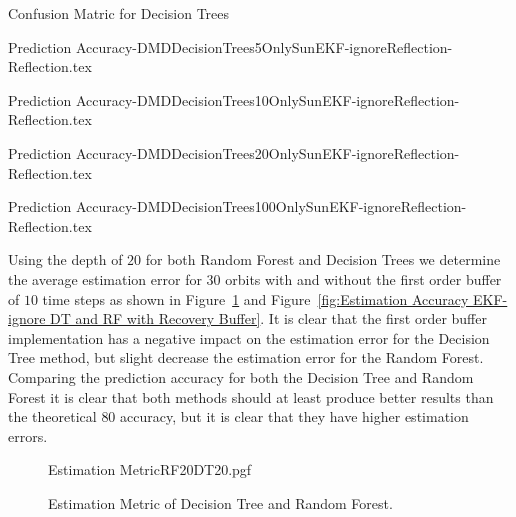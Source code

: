 \documentclass[letterpaper, 10 pt, conference]{ieeeconf}  %
\begin{document}
\begin{table*}[h!tb]
	\caption{Confusion Matric for Decision Trees} 
	\label{Table: Prediction Accuracy-DMDDecisionTreesOnlySunEKF-ignoreReflection-Reflection} 
	\centering
	\begin{minipage}[c]{0.2\textwidth}
		{Prediction Accuracy-DMDDecisionTrees5OnlySunEKF-ignoreReflection-Reflection.tex}
	\end{minipage}
	\begin{minipage}[c]{0.2\textwidth}
		{Prediction Accuracy-DMDDecisionTrees10OnlySunEKF-ignoreReflection-Reflection.tex}
	\end{minipage}
	\begin{minipage}[c]{0.2\textwidth}
		{Prediction Accuracy-DMDDecisionTrees20OnlySunEKF-ignoreReflection-Reflection.tex}
	\end{minipage}
	\begin{minipage}[c]{0.2\textwidth}
		{Prediction Accuracy-DMDDecisionTrees100OnlySunEKF-ignoreReflection-Reflection.tex}
	\end{minipage}
\end{table*}

Using the depth of $20$ for both Random Forest and Decision Trees we determine the average estimation error for $30$ orbits with and without the first order buffer of $10$ time steps as shown in Figure~\ref{fig:Estimation Accuracy EKF-ignore DT and RF} and Figure~\ref{fig:Estimation Accuracy EKF-ignore DT and RF with Recovery Buffer}. It is clear that the first order buffer implementation has a negative impact on the estimation error for the Decision Tree method, but slight decrease the estimation error for the Random Forest. Comparing the prediction accuracy for both the Decision Tree and Random Forest it is clear that both methods should at least produce better results than the theoretical $80$ accuracy, but it is clear that they have higher estimation errors. 

\begin{figure}[!htb]
	\begin{center}
		{Estimation MetricRF20DT20.pgf}
	\end{center}
	\caption[Estimation Metric of Decision Tree and Random Forest]{Estimation Metric of Decision Tree and Random Forest.}
	\label{fig:Estimation Accuracy EKF-ignore DT and RF}
\end{figure}
\end{document}
